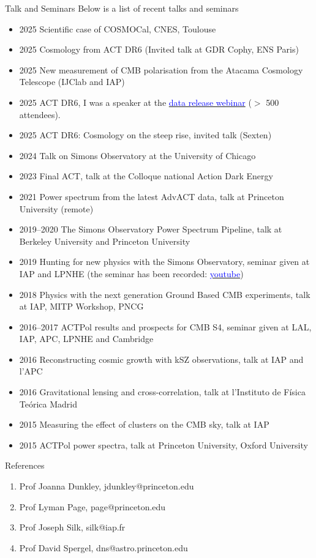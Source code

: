 \documentclass{resume} %
\newcommand{\TIB}[1]{\textcolor{blue}{#1}}
\begin{document}
\begin{rSection}{Talk and Seminars }
Below is a list of recent talks and seminars 
\begin{itemize}
\item  2025  Scientific case of COSMOCal, CNES, Toulouse
\item  2025  Cosmology from ACT DR6 (Invited talk at GDR Cophy, ENS Paris) 
\item  2025  New measurement of CMB polarisation from the Atacama Cosmology Telescope (IJClab and IAP) 
\item  2025  ACT DR6, I was a speaker at the  \href{https://www.youtube.com/watch?v=sETYHrDBXQg}{\TIB{data release webinar}} ($>$ 500 attendees).  
\item  2025  ACT DR6: Cosmology on the steep rise, invited talk (Sexten)  
\item  2024  Talk on Simons Observatory at the University of Chicago 
\item  2023  Final ACT, talk at the Colloque national Action Dark Energy 
\item  2021  Power spectrum from the latest AdvACT data, talk at Princeton University (remote) 
\item  2019--2020  The Simons Observatory Power Spectrum Pipeline, talk at Berkeley University and Princeton University 
\item  2019  Hunting for new physics with the Simons Observatory, seminar given at  IAP and  LPNHE (the seminar has been recorded: \href{https://www.youtube.com/watch?v=1XnZhEU1WgE}{\TIB{youtube}})  
\item  2018  Physics with the next generation Ground Based CMB experiments, talk at IAP, MITP Workshop, PNCG 
\item  2016--2017  ACTPol results and prospects for CMB S4, seminar given at LAL, IAP, APC,  LPNHE and Cambridge
\item  2016  Reconstructing cosmic growth with kSZ observations, talk at IAP and l'APC 
\item  2016  Gravitational lensing and cross-correlation, talk at l'Instituto de Física Teórica Madrid 
\item  2015  Measuring the effect of clusters on the CMB sky, talk at IAP 
\item  2015  ACTPol power spectra, talk at Princeton University, Oxford University
\end{itemize}

\end{rSection}


\begin{rSection}{References }

\begin{enumerate}
\item Prof Joanna Dunkley, jdunkley@princeton.edu
\item Prof Lyman Page, page@princeton.edu
\item Prof Joseph Silk, silk@iap.fr
\item Prof David Spergel, dns@astro.princeton.edu
\end{enumerate}

\end{rSection}
\end{document}

